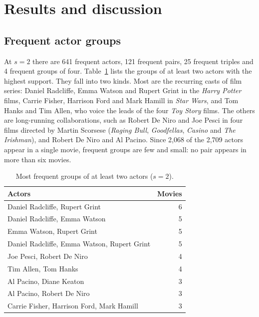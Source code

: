 \section{Results and discussion}
\label{sec:results}

\subsection{Frequent actor groups}

At $s = 2$ there are 641 frequent actors, 121 frequent pairs, 25 frequent triples and 4 frequent groups of four. Table~\ref{tab:groups} lists the groups of at least two actors with the highest support. They fall into two kinds. Most are the recurring casts of film series: Daniel Radcliffe, Emma Watson and Rupert Grint in the \emph{Harry Potter} films, Carrie Fisher, Harrison Ford and Mark Hamill in \emph{Star Wars}, and Tom Hanks and Tim Allen, who voice the leads of the four \emph{Toy Story} films. The others are long-running collaborations, such as Robert De Niro and Joe Pesci in four films directed by Martin Scorsese (\emph{Raging Bull}, \emph{Goodfellas}, \emph{Casino} and \emph{The Irishman}), and Robert De Niro and Al Pacino. Since 2{,}068 of the 2{,}709 actors appear in a single movie, frequent groups are few and small: no pair appears in more than six movies.

\begin{table}[ht]
  \centering
  \caption{Most frequent groups of at least two actors ($s = 2$).}
  \label{tab:groups}
  \begin{tabular}{lr}
    \toprule
    Actors & Movies \\
    \midrule
    Daniel Radcliffe, Rupert Grint & 6 \\
    Daniel Radcliffe, Emma Watson & 5 \\
    Emma Watson, Rupert Grint & 5 \\
    Daniel Radcliffe, Emma Watson, Rupert Grint & 5 \\
    Joe Pesci, Robert De Niro & 4 \\
    Tim Allen, Tom Hanks & 4 \\
    Al Pacino, Diane Keaton & 3 \\
    Al Pacino, Robert De Niro & 3 \\
    Carrie Fisher, Harrison Ford, Mark Hamill & 3 \\
    \bottomrule
  \end{tabular}
\end{table}

